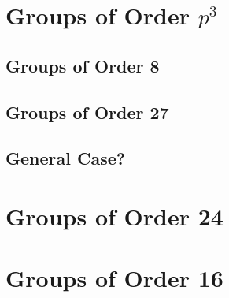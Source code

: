 \documentclass[a4paper, oneside, 12pt, final]{article}
\theoremstyle{definition}
\begin{document}
\section{Groups of Order \(p^3\)}
\subsection{Groups of Order 8}
\subsection{Groups of Order 27}
\subsection{General Case?}

\section{Groups of Order 24}

\section{Groups of Order 16}
\end{document}
